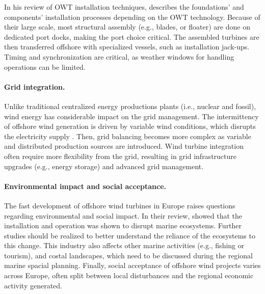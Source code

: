 In his review of OWT installation techniques, \citet{jiang_2021_owt_installation_review} describes the foundations' and components' installation processes depending on the OWT technology. 
Because of their large scale, most structural assembly (e.g., blades, or floater) are done on dedicated port docks, making the port choice critical.  
The assembled turbines are then transferred offshore with specialized vessels, such as installation jack-ups. 
Timing and synchronization are critical, as weather windows for handling operations can be limited.


\paragraph{Grid integration.}
Unlike traditional centralized energy productions plants (i.e., nuclear and fossil), wind energy has considerable impact on the grid management. 
The intermittency of offshore wind generation is driven by variable wind conditions, which disrupts the electricity supply \citep{heier_2014_grid_integration}. 
Then, grid balancing becomes more complex as variable and distributed production sources are introduced.  
Wind turbine integration often require more flexibility from the grid, resulting in grid infrastructure upgrades (e.g., energy storage) and advanced grid management. 


\paragraph{Environmental impact and social acceptance.} 
The fast development of offshore wind turbines in Europe raises questions regarding environmental and social impact. 
In their review, \citet{galparsoro_2022_owt_ecological_impact} showed that the installation and operation was shown to disrupt marine ecosystems.  
Further studies should be realized to better understand the reliance of the ecosystems to this change. 
This industry also affects other marine activities (e.g., fishing or tourism), and costal landscapes, which need to be discussed during the regional marine spacial planning. 
Finally, social acceptance of offshore wind projects varies across Europe, often split between local disturbances and the regional economic activity generated.  


